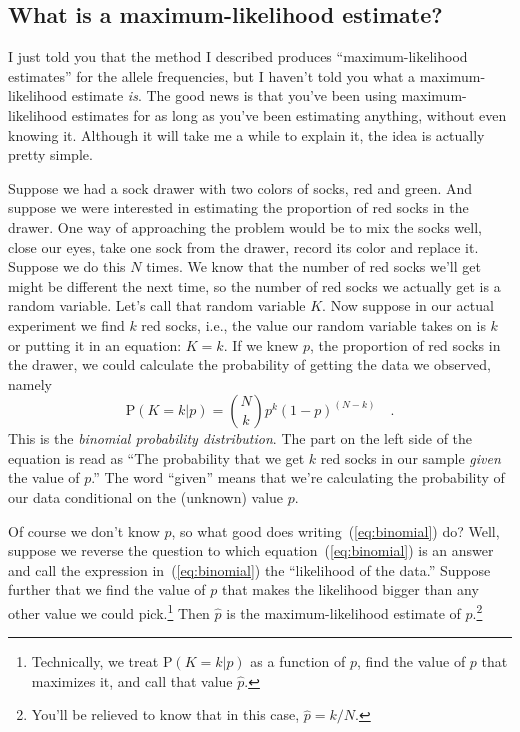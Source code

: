 \documentclass[12pt]{article}
\begin{document}
\subsection*{What is a maximum-likelihood
  estimate?}

I just told you that the method I described produces
``maximum-likelihood estimates'' for the allele frequencies, but I
haven't told you what a maximum-likelihood estimate {\it is\/}. The
good news is that you've been using maximum-likelihood estimates for
as long as you've been estimating anything, without even knowing
it. Although it will take me a while to explain it, the idea is
actually pretty simple.

Suppose we had a sock drawer with two colors of socks, red and
green. And suppose we were interested in estimating the proportion of
red socks in the drawer. One way of approaching the problem would be
to mix the socks well, close our eyes, take one sock from the drawer,
record its color and replace it. Suppose we do this $N$ times. We know
that the number of red socks we'll get might be different the next
time, so the number of red socks we actually get is a random
variable. Let's call that random variable $K$. Now suppose in our
actual experiment we find $k$ red socks, i.e., the value our random
variable takes on is $k$ or putting it in an equation: $K=k$. If we
knew $p$, the proportion of red socks in the drawer, we could
calculate the probability of getting the data we observed, namely
\begin{equation}
\mbox{P}(K=k|p) = {N \choose k} p^k (1-p)^{(N-k)} \quad . \label{eq:binomial}
\end{equation}
This is the {\it binomial probability distribution}. The part on the
left side of the equation is read as ``The probability that we get $k$
red socks in our sample {\it given\/} the value of $p$.'' The word
``given'' means that we're calculating the probability of our data
conditional on the (unknown) value $p$.

Of course we don't know $p$, so what good does
writing~(\ref{eq:binomial}) do? Well, suppose we reverse the question
to which equation~(\ref{eq:binomial}) is an answer and call the
expression in~(\ref{eq:binomial}) the ``likelihood of the data.''
Suppose further that we find the value of $p$ that makes the
likelihood bigger than any other value we could
pick.\footnote{Technically, we treat $\mbox{P}(K=k|p)$ as a function
  of $p$, find the value of $p$ that maximizes it, and call that value
  $\hat p$.} Then $\hat p$ is the maximum-likelihood estimate of
$p$.\footnote{You'll be relieved to know that in this case, $\hat p =
  k/N$.}
\end{document}
